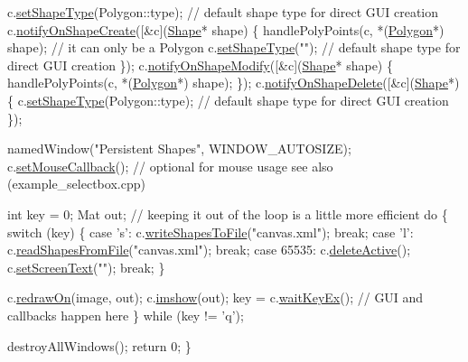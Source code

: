 \begin{DoxyCode}
    c.\hyperlink{classcanvascv_1_1Canvas_ac61735c6f4cb6a88d84331540ab25d39}{setShapeType}(Polygon::type); \textcolor{comment}{// default shape type for direct GUI creation}
    c.\hyperlink{classcanvascv_1_1Canvas_a64a459b16965e23de992cd2a301c68f4}{notifyOnShapeCreate}([&c](\hyperlink{classcanvascv_1_1Shape}{Shape}* shape)
    \{
        handlePolyPoints(c, *(\hyperlink{classcanvascv_1_1Polygon}{Polygon}*) shape); \textcolor{comment}{// it can only be a Polygon}
        c.\hyperlink{classcanvascv_1_1Canvas_ac61735c6f4cb6a88d84331540ab25d39}{setShapeType}(\textcolor{stringliteral}{""}); \textcolor{comment}{// default shape type for direct GUI creation}
    \});
    c.\hyperlink{classcanvascv_1_1Canvas_a5a6da8ae08b08a20d7fe15564bda5515}{notifyOnShapeModify}([&c](\hyperlink{classcanvascv_1_1Shape}{Shape}* shape)
    \{
        handlePolyPoints(c, *(\hyperlink{classcanvascv_1_1Polygon}{Polygon}*) shape);
    \});
    c.\hyperlink{classcanvascv_1_1Canvas_a1e7c26b39fd247e85941a6542f1b94c3}{notifyOnShapeDelete}([&c](\hyperlink{classcanvascv_1_1Shape}{Shape}*)
    \{
        c.\hyperlink{classcanvascv_1_1Canvas_ac61735c6f4cb6a88d84331540ab25d39}{setShapeType}(Polygon::type); \textcolor{comment}{// default shape type for direct GUI creation}
    \});

    namedWindow(\textcolor{stringliteral}{"Persistent Shapes"}, WINDOW\_AUTOSIZE);
    c.\hyperlink{classcanvascv_1_1Canvas_acf6e5d4b40aec610b0dc8c4f6bf93ac1}{setMouseCallback}(); \textcolor{comment}{// optional for mouse usage see also (example\_selectbox.cpp)}

    \textcolor{keywordtype}{int} key = 0;
    Mat out; \textcolor{comment}{// keeping it out of the loop is a little more efficient}
    \textcolor{keywordflow}{do}
    \{
        \textcolor{keywordflow}{switch} (key)
        \{
        \textcolor{keywordflow}{case} \textcolor{charliteral}{'s'}:
            c.\hyperlink{classcanvascv_1_1Canvas_a494bb06b1a29232f05807f4a0e480ebb}{writeShapesToFile}(\textcolor{stringliteral}{"canvas.xml"});
            \textcolor{keywordflow}{break};
        \textcolor{keywordflow}{case} \textcolor{charliteral}{'l'}:
            c.\hyperlink{classcanvascv_1_1Canvas_ab68000bb631c2fa7bb8863e746a8cff3}{readShapesFromFile}(\textcolor{stringliteral}{"canvas.xml"});
            \textcolor{keywordflow}{break};
        \textcolor{keywordflow}{case} 65535:
            c.\hyperlink{classcanvascv_1_1Canvas_a2fb88addb88a21757d4272e64acd30ae}{deleteActive}();
            c.\hyperlink{classcanvascv_1_1Canvas_aaedea276b82a8a4cfc0895ae81113cfd}{setScreenText}(\textcolor{stringliteral}{""});
            \textcolor{keywordflow}{break};
        \}

        c.\hyperlink{classcanvascv_1_1Canvas_a018c66e277de7904b8146ea3f3feebdd}{redrawOn}(image, out);
        c.\hyperlink{classcanvascv_1_1Canvas_acaf9494a5668046dd0a8908aa97a7a43}{imshow}(out);
        key = c.\hyperlink{classcanvascv_1_1Canvas_a59397db05f5d9e45264f626f6a2ae528}{waitKeyEx}(); \textcolor{comment}{// GUI and callbacks happen here}
    \} \textcolor{keywordflow}{while} (key != \textcolor{charliteral}{'q'});

    destroyAllWindows();
    \textcolor{keywordflow}{return} 0;
\}
\end{DoxyCode}
